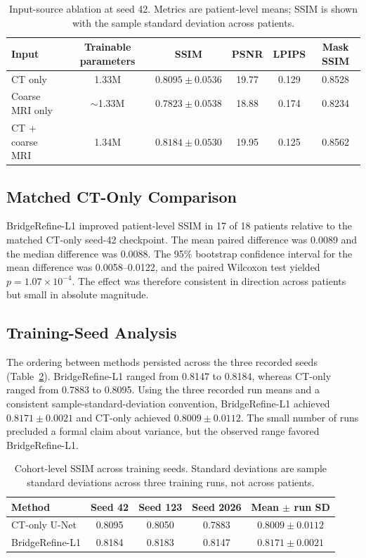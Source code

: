 \begin{table}[htbp]
\centering
\caption{Input-source ablation at seed 42. Metrics are patient-level means; SSIM is shown with the sample standard deviation across patients.}
\label{tab:input}
\begin{tabular}{lccccc}
\toprule
Input & Trainable parameters & SSIM & PSNR & LPIPS & Mask SSIM\\
\midrule
CT only & 1.33M & $0.8095\pm0.0536$ & 19.77 & 0.129 & 0.8528\\
Coarse MRI only & $\sim$1.33M & $0.7823\pm0.0538$ & 18.88 & 0.174 & 0.8234\\
CT + coarse MRI & 1.34M & $0.8184\pm0.0530$ & 19.95 & 0.125 & 0.8562\\
\bottomrule
\end{tabular}
\end{table}

\subsection{Matched CT-Only Comparison}

BridgeRefine-L1 improved patient-level SSIM in 17 of 18 patients relative to the matched CT-only seed-42 checkpoint. The mean paired difference was 0.0089 and the median difference was 0.0088. The 95\% bootstrap confidence interval for the mean difference was 0.0058--0.0122, and the paired Wilcoxon test yielded $p=1.07\times10^{-4}$. The effect was therefore consistent in direction across patients but small in absolute magnitude.

\subsection{Training-Seed Analysis}

The ordering between methods persisted across the three recorded seeds (Table~\ref{tab:seeds}). BridgeRefine-L1 ranged from 0.8147 to 0.8184, whereas CT-only ranged from 0.7883 to 0.8095. Using the three recorded run means and a consistent sample-standard-deviation convention, BridgeRefine-L1 achieved $0.8171\pm0.0021$ and CT-only achieved $0.8009\pm0.0112$. The small number of runs precluded a formal claim about variance, but the observed range favored BridgeRefine-L1.

\begin{table}[htbp]
\centering
\caption{Cohort-level SSIM across training seeds. Standard deviations are sample standard deviations across three training runs, not across patients.}
\label{tab:seeds}
\begin{tabular}{lcccc}
\toprule
Method & Seed 42 & Seed 123 & Seed 2026 & Mean $\pm$ run SD\\
\midrule
CT-only U-Net & 0.8095 & 0.8050 & 0.7883 & $0.8009\pm0.0112$\\
BridgeRefine-L1 & 0.8184 & 0.8183 & 0.8147 & $0.8171\pm0.0021$\\
\bottomrule
\end{tabular}
\end{table}

